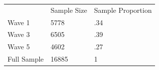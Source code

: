 \documentclass{article}
\begin{document}
\begin{table}[!h]
\centering
\begin{tabular}{lll}
\cline{1-3}
\multicolumn{1}{|l}{} &
  \multicolumn{1}{|l}{Sample Size} &
  \multicolumn{1}{|l|}{Sample Proportion} \\
\cline{1-3}
\multicolumn{1}{|l}{Wave 1} &
  \multicolumn{1}{|l}{5778} &
  \multicolumn{1}{|l|}{.34} \\
\cline{1-3}
\multicolumn{1}{|l}{Wave 3} &
  \multicolumn{1}{|l}{6505} &
  \multicolumn{1}{|l|}{.39} \\
\cline{1-3}
\multicolumn{1}{|l}{Wave 5} &
  \multicolumn{1}{|l}{4602} &
  \multicolumn{1}{|l|}{.27} \\
\cline{1-3}
\multicolumn{1}{|l}{Full Sample} &
  \multicolumn{1}{|l}{16885} &
  \multicolumn{1}{|l|}{1} \\
\cline{1-3}
\end{tabular}
\end{table}
\end{document}
